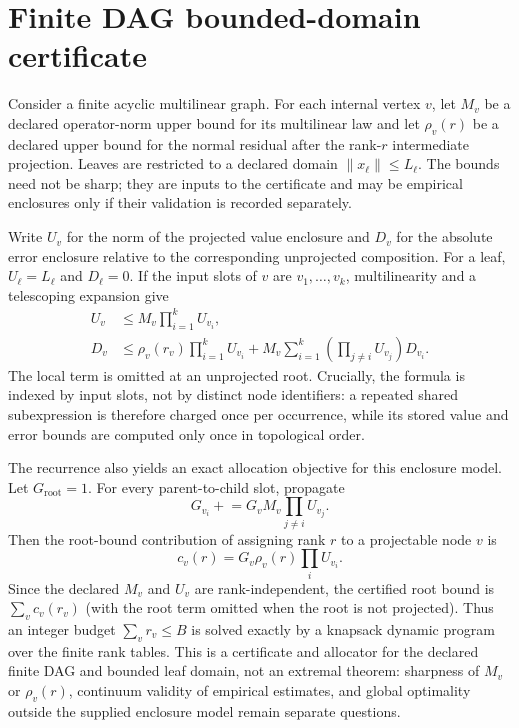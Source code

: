 \section{Finite DAG bounded-domain certificate}
\label{sec:finite-dag-domain-certificate}

Consider a finite acyclic multilinear graph.  For each internal vertex $v$,
let $M_v$ be a declared operator-norm upper bound for its multilinear law and
let $\rho_v(r)$ be a declared upper bound for the normal residual after the
rank-$r$ intermediate projection.  Leaves are restricted to a declared domain
$\|x_\ell\|\le L_\ell$.  The bounds need not be sharp; they are inputs to the
certificate and may be empirical enclosures only if their validation is
recorded separately.

Write $U_v$ for the norm of the projected value enclosure and $D_v$ for the
absolute error enclosure relative to the corresponding unprojected
composition.  For a leaf, $U_\ell=L_\ell$ and $D_\ell=0$.  If the input slots of
$v$ are $v_1,\ldots,v_k$, multilinearity and a telescoping expansion give
\begin{align*}
 U_v &\le M_v\prod_{i=1}^k U_{v_i},\\
 D_v &\le \rho_v(r_v)\prod_{i=1}^k U_{v_i}
       +M_v\sum_{i=1}^k
        \left(\prod_{j\ne i}U_{v_j}\right)D_{v_i}.
\end{align*}
The local term is omitted at an unprojected root.  Crucially, the formula is
indexed by input slots, not by distinct node identifiers: a repeated shared
subexpression is therefore charged once per occurrence, while its stored
value and error bounds are computed only once in topological order.

The recurrence also yields an exact allocation objective for this enclosure
model.  Let $G_{\mathrm{root}}=1$.  For every parent-to-child slot, propagate
\begin{equation*}
 G_{v_i}\mathrel{+}=G_v M_v\prod_{j\ne i}U_{v_j}.
\end{equation*}
Then the root-bound contribution of assigning rank $r$ to a projectable node
$v$ is
\begin{equation*}
 c_v(r)=G_v\rho_v(r)\prod_i U_{v_i}.
\end{equation*}
Since the declared $M_v$ and $U_v$ are rank-independent, the certified root
bound is $\sum_v c_v(r_v)$ (with the root term omitted when the root is not
projected).  Thus an integer budget $\sum_v r_v\le B$ is solved exactly by a
knapsack dynamic program over the finite rank tables.  This is a certificate
and allocator for the declared finite DAG and bounded leaf domain, not an
extremal theorem: sharpness of $M_v$ or $\rho_v(r)$, continuum validity of
empirical estimates, and global optimality outside the supplied enclosure
model remain separate questions.

